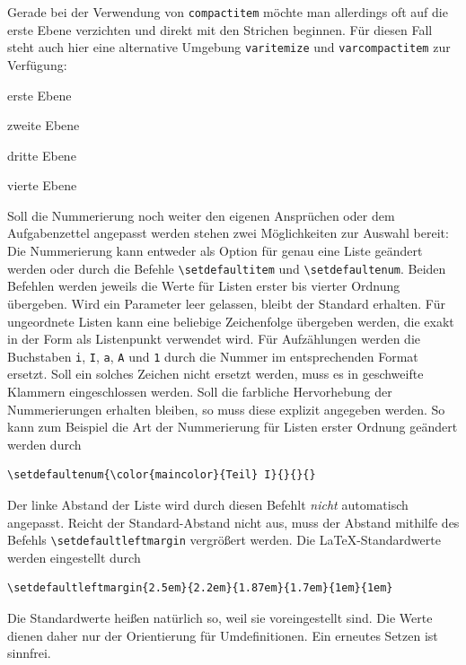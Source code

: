 \documentclass{exercise}
\begin{document}
    Gerade bei der Verwendung von \lstinline{compactitem} möchte man allerdings oft auf die erste Ebene verzichten und direkt mit den Strichen beginnen. Für diesen Fall steht auch hier eine alternative Umgebung \lstinline{varitemize} und \lstinline{varcompactitem} zur Verfügung:
    \begin{varcompactitem}
      \item erste Ebene
        \begin{compactitem}
          \item zweite Ebene
            \begin{compactitem}
              \item dritte Ebene
                \begin{compactitem}
                  \item vierte Ebene
                \end{compactitem}
            \end{compactitem}
        \end{compactitem}
    \end{varcompactitem}

    Soll die Nummerierung noch weiter den eigenen Ansprüchen oder dem Aufgabenzettel angepasst werden stehen zwei Möglichkeiten zur Auswahl bereit: Die Nummerierung kann entweder als Option für genau eine Liste geändert werden oder durch die Befehle \lstinline-\setdefaultitem- und \lstinline-\setdefaultenum-. Beiden Befehlen werden jeweils die Werte für Listen erster bis vierter Ordnung übergeben. Wird ein Parameter leer gelassen, bleibt der Standard erhalten. Für ungeordnete Listen kann eine beliebige Zeichenfolge übergeben werden, die exakt in der Form als Listenpunkt verwendet wird. Für Aufzählungen werden die Buchstaben \texttt{i}, \texttt{I}, \texttt{a}, \texttt{A} und \texttt{1} durch die Nummer im entsprechenden Format ersetzt. Soll ein solches Zeichen nicht ersetzt werden, muss es in geschweifte Klammern eingeschlossen werden. Soll die farbliche Hervorhebung der Nummerierungen erhalten bleiben, so muss diese explizit angegeben werden. So kann zum Beispiel die Art der Nummerierung für Listen erster Ordnung geändert werden durch
    \begin{lstlisting}[gobble=6]
      \setdefaultenum{\color{maincolor}{Teil} I}{}{}{}
    \end{lstlisting}
    Der linke Abstand der Liste wird durch diesen Befehlt \emph{nicht} automatisch angepasst. Reicht der Standard-Abstand nicht aus, muss der Abstand mithilfe des Befehls \lstinline-\setdefaultleftmargin- vergrößert werden. Die \LaTeX{}-Standardwerte werden eingestellt durch
    \begin{lstlisting}[gobble=6]
      \setdefaultleftmargin{2.5em}{2.2em}{1.87em}{1.7em}{1em}{1em}
    \end{lstlisting}
    Die Standardwerte heißen natürlich so, weil sie voreingestellt sind. Die Werte dienen daher nur der Orientierung für Umdefinitionen. Ein erneutes Setzen ist sinnfrei.
\end{document}
